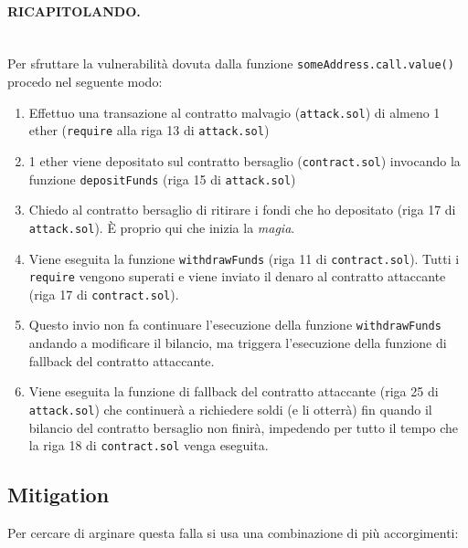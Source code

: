 \paragraph{RICAPITOLANDO.}\ \\
Per sfruttare la vulnerabilità dovuta dalla funzione \verb|someAddress.call.value()|
procedo nel seguente modo:

\begin{enumerate}
      \item Effettuo una transazione al contratto malvagio (\verb|attack.sol|) di almeno
            1 ether (\verb|require| alla riga 13 di \verb|attack.sol|)
      \item 1 ether viene depositato sul contratto bersaglio (\verb|contract.sol|) invocando
            la funzione \verb|depositFunds| (riga 15 di \verb|attack.sol|)
      \item Chiedo al contratto bersaglio di ritirare i fondi che ho depositato
            (riga 17 di \verb|attack.sol|). È proprio qui che inizia la \textit{magia}.
      \item  Viene eseguita la funzione \verb|withdrawFunds| (riga 11 di \verb|contract.sol|).
            Tutti i \verb|require| vengono superati e viene inviato il denaro al contratto attaccante
            (riga 17 di \verb|contract.sol|).
      \item Questo invio non fa continuare l'esecuzione della funzione \verb|withdrawFunds|
            andando a modificare il bilancio, ma triggera l'esecuzione della funzione
            di fallback del contratto attaccante.
      \item  Viene eseguita la funzione di fallback del contratto attaccante
            (riga 25 di \verb|attack.sol|) che continuerà a richiedere soldi
            (e li otterrà) fin
            quando il bilancio del contratto bersaglio non finirà, impedendo
            per tutto il tempo che la riga 18 di \verb|contract.sol| venga eseguita.
\end{enumerate}

\subsection{Mitigation}

Per cercare di arginare questa falla si usa una combinazione di più accorgimenti:

